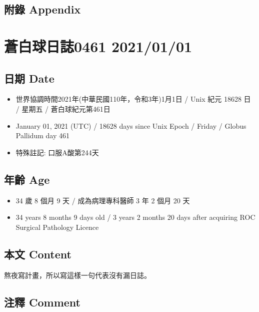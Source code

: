 \documentclass[a5paper, 10pt
]{book}
\providecommand{\tightlist}{%
  \setlength{\itemsep}{0pt}\setlength{\parskip}{0pt}}
\begin{document}
\hypertarget{ux9644ux9304-appendix-30}{%
\subsection{附錄 Appendix}\label{ux9644ux9304-appendix-30}}

\hypertarget{ux84bcux767dux7403ux65e5ux8a8c0461-20210101}{%
\section{蒼白球日誌0461
2021/01/01}\label{ux84bcux767dux7403ux65e5ux8a8c0461-20210101}}

\hypertarget{ux65e5ux671f-date-31}{%
\subsection{日期 Date}\label{ux65e5ux671f-date-31}}

\begin{itemize}
\tightlist
\item
  世界協調時間2021年(中華民國110年，令和3年)1月1日 / Unix 紀元 18628 日
  / 星期五 / 蒼白球紀元第461日
\item
  January 01, 2021 (UTC) / 18628 days since Unix Epoch / Friday / Globus
  Pallidum day 461
\item
  特殊註記: 口服A酸第244天
\end{itemize}

\hypertarget{ux5e74ux9f61-age-31}{%
\subsection{年齡 Age}\label{ux5e74ux9f61-age-31}}

\begin{itemize}
\tightlist
\item
  34 歲 8 個月 9 天 / 成為病理專科醫師 3 年 2 個月 20 天
\item
  34 years 8 months 9 days old / 3 years 2 months 20 days after
  acquiring ROC Surgical Pathology Licence
\end{itemize}

\hypertarget{ux672cux6587-content-31}{%
\subsection{本文 Content}\label{ux672cux6587-content-31}}

熬夜寫計畫，所以寫這樣一句代表沒有漏日誌。

\hypertarget{ux6ce8ux91cb-comment-31}{%
\subsection{注釋 Comment}\label{ux6ce8ux91cb-comment-31}}
\end{document}
